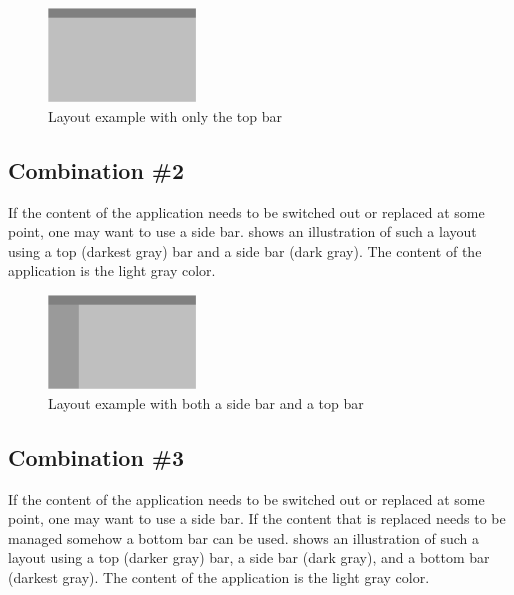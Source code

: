 \begin{figure}[!htbp]
    \centering
    \includegraphics[width=0.35\textwidth]{pictures/application_structure/bar_combinations_1}
    \caption{Layout example with only the top bar}
    \label{fig:bar_combinations_1}
\end{figure}

\FloatBarrier

\subsection{Combination \#2}
If the content of the application needs to be switched out or replaced at some point, one may want to use a side bar.  shows an illustration of such a layout using a top (darkest gray) bar and a side bar (dark gray). The content of the application is the light gray color.

\begin{figure}[!htbp]
    \centering
    \includegraphics[width=0.35\textwidth]{pictures/application_structure/bar_combinations_2}
    \caption{Layout example with both a side bar and a top bar}
    \label{fig:bar_combinations_2}
\end{figure}

\FloatBarrier

\subsection{Combination \#3}
If the content of the application needs to be switched out or replaced at some point, one may want to use a side bar. If the content that is replaced needs to be managed somehow a bottom bar can be used.  shows an illustration of such a layout using a top (darker gray) bar, a side bar (dark gray), and a bottom bar (darkest gray). The content of the application is the light gray color.

